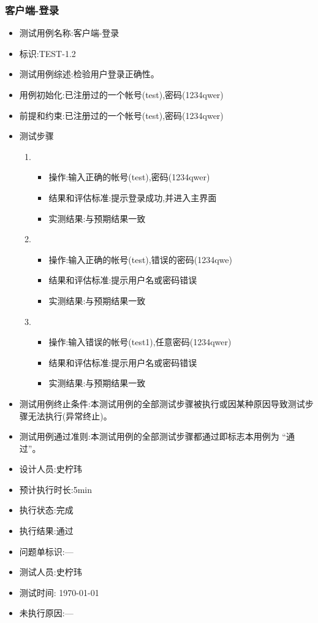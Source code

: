 \documentclass{article}
\begin{document}
\subsubsection{客户端-登录}
\begin{itemize}
\item 测试用例名称:客户端-登录
\item 标识:TEST-1.2
\item 测试用例综述:检验用户登录正确性。
\item 用例初始化:已注册过的一个帐号(test),密码(1234qwer)
\item 前提和约束:已注册过的一个帐号(test),密码(1234qwer)
\item 测试步骤
  \begin{enumerate}
  \item
    \begin{itemize}
    \item 操作:输入正确的帐号(test),密码(1234qwer)
    \item 结果和评估标准:提示登录成功,并进入主界面
    \item 实测结果:与预期结果一致
    \end{itemize}
  \item
    \begin{itemize}
    \item 操作:输入正确的帐号(test),错误的密码(1234qwe)
    \item 结果和评估标准:提示用户名或密码错误
    \item 实测结果:与预期结果一致
    \end{itemize}
  \item
    \begin{itemize}
    \item 操作:输入错误的帐号(test1),任意密码(1234qwer)
    \item 结果和评估标准:提示用户名或密码错误
    \item 实测结果:与预期结果一致
    \end{itemize}
  \end{enumerate}
  
\item 测试用例终止条件:本测试用例的全部测试步骤被执行或因某种原因导致测试步骤无法执行(异常终止)。
\item 测试用例通过准则:本测试用例的全部测试步骤都通过即标志本用例为 “通过”。
\item 设计人员:史柠玮
\item 预计执行时长:5min
\item 执行状态:完成
\item 执行结果:通过
\item 问题单标识:---
\item 测试人员:史柠玮
\item 测试时间: \today
\item 未执行原因:---
\end{itemize}
\end{document}
